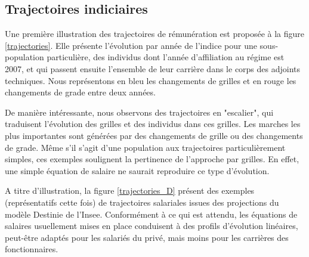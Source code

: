 \documentclass[11pt,a4paper]{article}
\begin{document}
\subsection{Trajectoires indiciaires}

Une première illustration des trajectoires de rémunération est proposée à la figure \ref{trajectories}. Elle présente l'évolution par année de l'indice pour une sous-population particulière, des individus dont l'année d'affiliation au régime est 2007, et qui passent ensuite l'ensemble de leur carrière dans le corps des adjoints techniques. Nous représentons en bleu les changements de grilles et en rouge les changements de grade entre deux années. 

De manière intéressante, nous observons des trajectoires en "escalier", qui traduisent l'évolution des grilles et des individus dans ces grilles. Les marches les plus importantes sont générées par des changements de grille ou des changements de grade. Même s'il s'agit d'une population aux trajectoires particulièrement simples, ces exemples soulignent la pertinence de l'approche par grilles. En effet, une simple équation de salaire ne saurait reproduire ce type d'évolution. 

A titre d'illustration, la figure \ref{trajectories_D} présent des exemples (représentatifs cette fois) de trajectoires salariales issues des projections du modèle Destinie de l'Insee. Conformément à ce qui est attendu, les équations de salaires usuellement mises en place conduisent à des profils d'évolution linéaires, peut-être  adaptés pour les salariés du privé, mais moins pour les carrières des fonctionnaires. 
\end{document}
